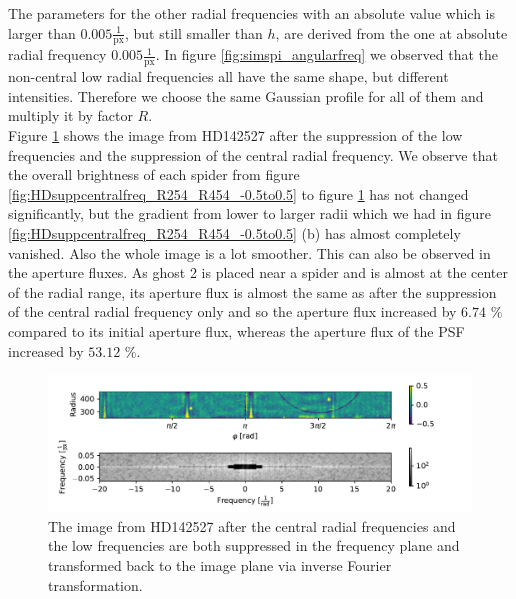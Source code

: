 The parameters for the other radial frequencies with an absolute value which is larger than $0.005 \frac{1}{\mathrm{px}}$, but still smaller than $h$, are derived from the one at absolute radial frequency $0.005 \frac{1}{\mathrm{px}}$. In figure \ref{fig:simspi_angularfreq} we observed that the non-central low radial frequencies all have the same shape, but different intensities. Therefore we choose the same Gaussian profile for all of them and multiply it by factor $R$.\\
Figure \ref{fig:HDsupplowfreq_R254_R454_-0.5to0.5.pdf} shows the image from HD142527 after the suppression of the low frequencies and the suppression of the central radial frequency. We observe that the overall brightness of each spider from figure \ref{fig:HDsuppcentralfreq_R254_R454_-0.5to0.5} to figure \ref{fig:HDsupplowfreq_R254_R454_-0.5to0.5.pdf} has not changed significantly, but the gradient from lower to larger radii which we had in figure \ref{fig:HDsuppcentralfreq_R254_R454_-0.5to0.5} (b) has almost completely vanished. Also the whole image is a lot smoother. This can also be observed in the aperture fluxes. As ghost 2 is placed near a spider and is almost at the center of the radial range, its aperture flux is almost the same as after the suppression of the central radial frequency only and so the aperture flux increased by $6.74$ \% compared to its initial aperture flux, whereas the aperture flux of the PSF increased by $53.12$ \%. 
\begin{figure}[H]
	\centering
		\includegraphics[width=1.1\textwidth]{pics/HDsupplowfreq_R254_R454_-0.5to0.5.pdf}
		\caption{The image from HD142527 after the central radial frequencies and the low frequencies are both suppressed in the frequency plane and transformed back to the image plane via inverse Fourier transformation.}
		\label{fig:HDsupplowfreq_R254_R454_-0.5to0.5.pdf}
\end{figure}
